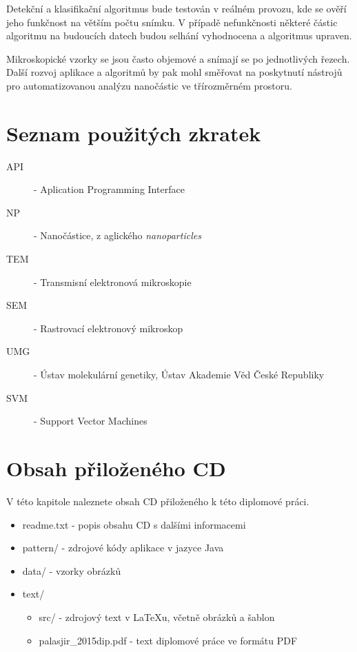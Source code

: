 \documentclass[11pt,twoside,a4paper,table]{book}
\begin{document}
Detekční a klasifikační algoritmus bude testován v reálném provozu, kde se ověří jeho funkčnost na větším počtu snímku. V případě nefunkčnosti některé částic algoritmu na budoucích datech budou selhání vyhodnocena a algoritmus upraven.

Mikroskopické vzorky se jsou často objemové a snímají se po jednotlivých řezech. Další rozvoj aplikace a algoritmů by pak mohl směřovat na poskytnutí nástrojů pro automatizovanou analýzu nanočástic ve třírozměrném prostoru.



{

}
\appendix


\chapter{Seznam použitých zkratek}

\begin{description}
\item[API] - Aplication Programming Interface
\item[NP] - Nanočástice, z aglického \textit{nanoparticles}
\item[TEM] - Transmisní elektronová mikroskopie
\item[SEM] - Rastrovací elektronový mikroskop
\item[UMG] - Ústav molekulární genetiky, Ústav Akademie Věd České Republiky
\item[SVM] - Support Vector Machines
\end{description}

\clearpage
\thispagestyle{empty}
\chapter{Obsah přiloženého CD}
V této kapitole naleznete obsah CD přiloženého k této diplomové práci.

\begin{itemize}
	\item readme.txt - popis obsahu CD s dalšími informacemi
	\item pattern/ - zdrojové kódy aplikace v jazyce Java
	\item data/ - vzorky obrázků
	\item text/
	\begin{itemize}
		\item src/ - zdrojový text v LaTeXu, včetně obrázků a šablon
		\item palasjir\_2015dip.pdf - text diplomové práce ve formátu PDF
	\end{itemize} 
\end{itemize}
\end{document}
